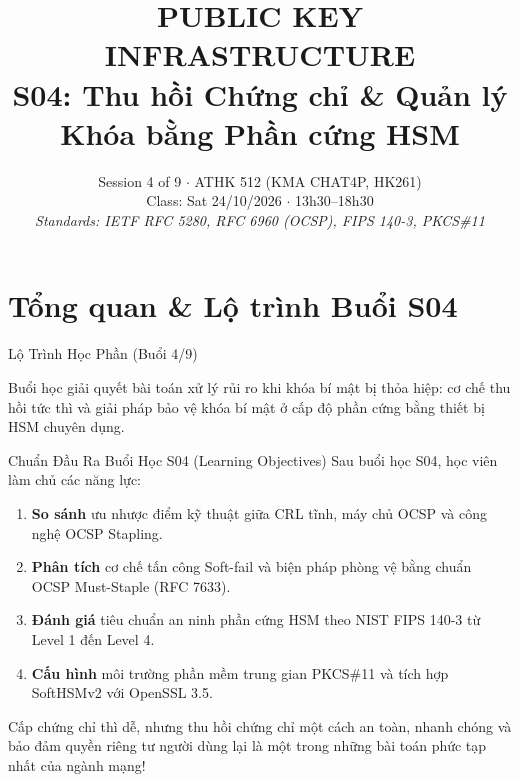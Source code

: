 
\title{\color{hcmutblue}\textbf{\LARGE PUBLIC KEY INFRASTRUCTURE}\\[0.25em]
       \color{hcmutblue}\textbf{\large S04: Thu hồi Chứng chỉ \& Quản lý Khóa bằng Phần cứng HSM}}
\date{\footnotesize Session 4 of 9 $\cdot$ ATHK 512 (KMA CHAT4P, HK261)\\
      Class: Sat 24/10/2026 $\cdot$ 13h30--18h30\\
      \textit{Standards: IETF RFC 5280, RFC 6960 (OCSP), FIPS 140-3, PKCS\#11}}


\PKItitleframe

\section{Tổng quan \& Lộ trình Buổi S04}

\begin{frame}{Lộ Trình Học Phần (Buổi 4/9)}
  \centering
  \vspace{0.4em}
  \raggedright\small
  Buổi học giải quyết bài toán xử lý rủi ro khi khóa bí mật bị thỏa hiệp: cơ chế thu hồi tức thì và giải pháp bảo vệ khóa bí mật ở cấp độ phần cứng bằng thiết bị HSM chuyên dụng.
\end{frame}

\begin{frame}{Chuẩn Đầu Ra Buổi Học S04 (Learning Objectives)}
  \small
  Sau buổi học S04, học viên làm chủ các năng lực:
  \begin{enumerate}
    \item \textbf{So sánh} ưu nhược điểm kỹ thuật giữa CRL tĩnh, máy chủ OCSP và công nghệ OCSP Stapling.
    \item \textbf{Phân tích} cơ chế tấn công Soft-fail và biện pháp phòng vệ bằng chuẩn OCSP Must-Staple (RFC 7633).
    \item \textbf{Đánh giá} tiêu chuẩn an ninh phần cứng HSM theo NIST FIPS 140-3 từ Level 1 đến Level 4.
    \item \textbf{Cấu hình} môi trường phần mềm trung gian PKCS\#11 và tích hợp SoftHSMv2 với OpenSSL 3.5.
  \end{enumerate}

  \begin{keybox}
    Cấp chứng chỉ thì dễ, nhưng thu hồi chứng chỉ một cách an toàn, nhanh chóng và bảo đảm quyền riêng tư người dùng lại là một trong những bài toán phức tạp nhất của ngành mạng!
  \end{keybox}
\end{frame}

